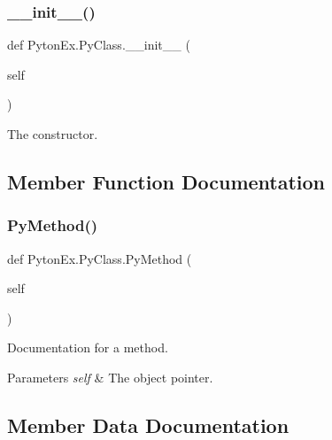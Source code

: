 \subsubsection{\texorpdfstring{\+\_\+\+\_\+init\+\_\+\+\_\+()}{\_\_init\_\_()}}
{\footnotesize\ttfamily def Pyton\+Ex.\+Py\+Class.\+\_\+\+\_\+init\+\_\+\+\_\+ (\begin{DoxyParamCaption}\item[{}]{self }\end{DoxyParamCaption})}



The constructor. 



\subsection{Member Function Documentation}
\mbox{\label{class_pyton_ex_1_1_py_class_a7dde6279efa8bda01061ac2a00e229ab}} 
\subsubsection{\texorpdfstring{Py\+Method()}{PyMethod()}}
{\footnotesize\ttfamily def Pyton\+Ex.\+Py\+Class.\+Py\+Method (\begin{DoxyParamCaption}\item[{}]{self }\end{DoxyParamCaption})}



Documentation for a method. 


\begin{DoxyParams}{Parameters}
{\em self} & The object pointer. \\
\hline
\end{DoxyParams}


\subsection{Member Data Documentation}
\mbox{\label{class_pyton_ex_1_1_py_class_afb9799b2759973a1b079f4da0f0242a3}} 

